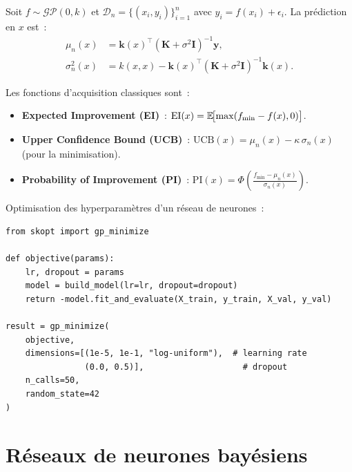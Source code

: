 \begin{theoreme}
Soit $f \sim \mathcal{GP}(0, k)$ et $\mathcal{D}_n = \{(x_i, y_i)\}_{i=1}^n$
avec $y_i = f(x_i) + \epsilon_i$. La pr\'ediction en $x$ est~:
\begin{align}
  \mu_n(x) &= \mathbf{k}(x)^\top (\mathbf{K} + \sigma^2 \mathbf{I})^{-1}\mathbf{y}, \\
  \sigma_n^2(x) &= k(x,x) - \mathbf{k}(x)^\top (\mathbf{K} + \sigma^2 \mathbf{I})^{-1}\mathbf{k}(x).
\end{align}
\end{theoreme}

\begin{definition}
Les fonctions d'acquisition classiques sont~:
\begin{itemize}
  \item \textbf{Expected Improvement (EI)}~:
    $\mathrm{EI}(x) = \mathbb{E}\!\bigl[\max(f_{\min} - f(x), 0)\bigr]$.
  \item \textbf{Upper Confidence Bound (UCB)}~:
    $\mathrm{UCB}(x) = \mu_n(x) - \kappa\,\sigma_n(x)$ (pour la minimisation).
  \item \textbf{Probability of Improvement (PI)}~:
    $\mathrm{PI}(x) = \Phi\!\left(\frac{f_{\min} - \mu_n(x)}{\sigma_n(x)}\right)$.
\end{itemize}
\end{definition}

\begin{exemple}
Optimisation des hyperparam\`etres d'un r\'eseau de neurones~:
\begin{verbatim}
from skopt import gp_minimize

def objective(params):
    lr, dropout = params
    model = build_model(lr=lr, dropout=dropout)
    return -model.fit_and_evaluate(X_train, y_train, X_val, y_val)

result = gp_minimize(
    objective,
    dimensions=[(1e-5, 1e-1, "log-uniform"),  # learning rate
                (0.0, 0.5)],                    # dropout
    n_calls=50,
    random_state=42
)
\end{verbatim}
\end{exemple}

\section{R\'eseaux de neurones bay\'esiens}

